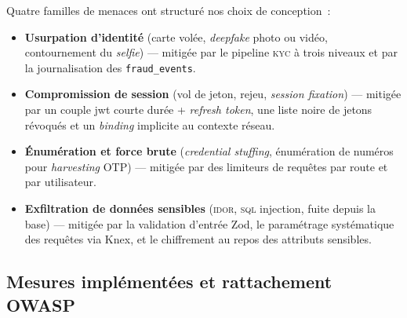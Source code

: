 \documentclass[12pt, a4paper, oneside]{report}
\begin{document}
Quatre familles de menaces ont structuré nos choix de conception~:
\begin{itemize}
  \item \textbf{Usurpation d'identité} (carte volée, \textit{deepfake} photo ou vidéo, contournement du \textit{selfie}) --- mitigée par le pipeline \textsc{kyc} à trois niveaux et par la journalisation des \texttt{fraud\_events}.
  \item \textbf{Compromission de session} (vol de jeton, rejeu, \textit{session fixation}) --- mitigée par un couple \gls{jwt} courte durée + \textit{refresh token}, une liste noire de jetons révoqués et un \textit{binding} implicite au contexte réseau.
  \item \textbf{Énumération et force brute} (\textit{credential stuffing}, énumération de numéros pour \textit{harvesting} OTP) --- mitigée par des limiteurs de requêtes par route et par utilisateur.
  \item \textbf{Exfiltration de données sensibles} (\textsc{idor}, \textsc{sql} injection, fuite depuis la base) --- mitigée par la validation d'entrée Zod, le paramétrage systématique des requêtes via Knex, et le chiffrement au repos des attributs sensibles.
\end{itemize}

\subsection{Mesures implémentées et rattachement OWASP}
\end{document}
